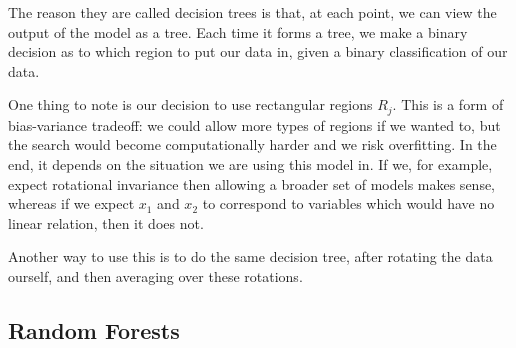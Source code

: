 \documentclass[12pt]{article}
\begin{document}
The reason they are called decision trees is that, at each point, we can view the output of the model as a tree. Each time it forms a tree, we make a binary decision as to which region to put our data in, given a binary classification of our data.

One thing to note is our decision to use rectangular regions $R_j$. This is a form of bias-variance tradeoff: we could allow more types of regions if we wanted to, but the search would become computationally harder and we risk overfitting. In the end, it depends on the situation we are using this model in. If we, for example, expect rotational invariance then allowing a broader set of models makes sense, whereas if we expect $x_1$ and $x_2$ to correspond to variables which would have no linear relation, then it does not.

Another way to use this is to do the same decision tree, after rotating the data ourself, and then averaging over these rotations.


\subsection{Random Forests}
\label{sub:rand_for}
\end{document}
